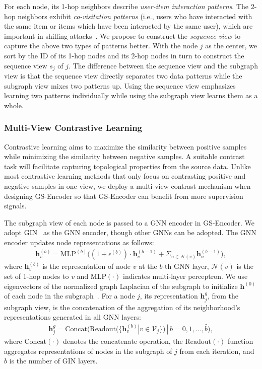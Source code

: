 For each node, its 1-hop neighbors describe \emph{user-item interaction patterns}. 
The 2-hop neighbors exhibit \emph{co-visitation patterns} (i.e., users who have interacted with the same item or items which have been interacted by the same user), which are important in shilling attacks~\citep{YangGC17}.
We propose to construct the \emph{sequence view} to capture the above two types of patterns better.
With the node $j$ as the center, we sort by the ID of its 1-hop nodes and its 2-hop nodes in turn to construct the sequence view $s_j$ of $j$.
The difference between the sequence view and the subgraph view is that the sequence view directly separates two data patterns while the subgraph view mixes two patterns up. Using the sequence view emphasizes learning two patterns individually while using the subgraph view learns them as a whole.


\subsubsection{Multi-View Contrastive Learning}  
Contrastive learning aims to maximize the similarity between positive samples while minimizing the similarity between negative samples.  
A suitable contrast task will facilitate capturing topological properties from the source data. 
Unlike most contrastive learning methods that only focus on contrasting positive and negative samples in one view, we deploy a multi-view contrast mechanism when designing GS-Encoder so that GS-Encoder can benefit from more supervision signals.

The subgraph view of each node is passed to a GNN encoder in GS-Encoder. 
We adopt GIN~\citep{XuHLJ19} as the GNN encoder, though other GNNs can be adopted.
The GNN encoder updates node representations as follows:
\begin{equation}
	\begin{aligned}
		\mathbf{h}_v^{(b)} = \text{MLP}^{(b)}\big((1 + \epsilon^{(b)}) \cdot \mathbf{h}_v^{(b-1)} 
			+ \Sigma_{u \in \mathcal{N}(v)}\mathbf{h}_u^{(b-1)}\big),
	\end{aligned}
\end{equation}
where $\mathbf{h}_v^{(b)}$ is the representation of node $v$ at the $b$-th GNN layer,  $\mathcal{N}(v)$ is the set of 1-hop nodes to $v$ and $\text{MLP}(\cdot)$ indicates multi-layer perceptron. 
We use eigenvectors of the normalized graph Laplacian of the subgraph to initialize $\mathbf{h}^{(0)}$ of each node in the subgraph~\citep{QiuCDZYDWT20}.
For a node $j$, its representation $\mathbf{h}_j^g$, from the subgraph view, is the concatenation of the aggregation of its neighborhood's representations generated in all GNN layers: 
\begin{equation}
	\begin{aligned}
		\mathbf{h}_j^g = \text{Concat}\big(\text{Readout}(\{\mathbf{h}_v^{(b)}|v \in \mathcal{V}_j \})\,|\,b=0,1,...,\hat{b}\big),
	\end{aligned}
\end{equation}
where $\text{Concat}(\cdot)$ denotes the concatenate operation, the $\text{Readout}(\cdot)$ function aggregates representations of nodes in the subgraph of $j$ from each iteration, and $\hat{b}$ is the number of GIN layers.

